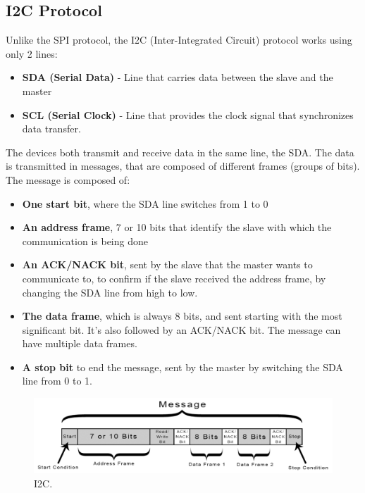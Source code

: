 \documentclass[english]{ist-thesis}
\begin{document}
\subsection{I2C Protocol}

Unlike the SPI protocol, the I2C (Inter-Integrated Circuit) protocol works using only 2 lines:

\begin{itemize}
  \item \textbf{SDA (Serial Data)} - Line that carries data between the slave and the master
  \item \textbf{SCL (Serial Clock)} - Line that provides the clock signal that synchronizes data transfer.
\end{itemize}

The devices both transmit and receive data in the same line, the SDA. The data is transmitted in messages, that are composed of different frames (groups of bits). The message is composed of:

\begin{itemize}
  \item \textbf{One start bit}, where the SDA line switches from 1 to 0
  \item \textbf{An address frame}, 7 or 10 bits that identify the slave with which the communication is being done
  \item \textbf{An ACK/NACK bit}, sent by the slave that the master wants to communicate to, to confirm if the slave received the address frame, by changing the SDA line from high to low.
  \item \textbf{The data frame}, which is always 8 bits, and sent starting with the most significant bit. It's also followed by an ACK/NACK bit. The message can have multiple data frames.
  \item \textbf{A stop bit} to end the message, sent by the master by switching the SDA line from 0 to 1.
\end{itemize}

\begin{figure}[ht]
	\centering
	\includegraphics[width = 0.8\linewidth]{images/protocolos/i2c_message.png}
	\caption{I2C.}
	\label{fig:i2c}
\end{figure}
\end{document}
